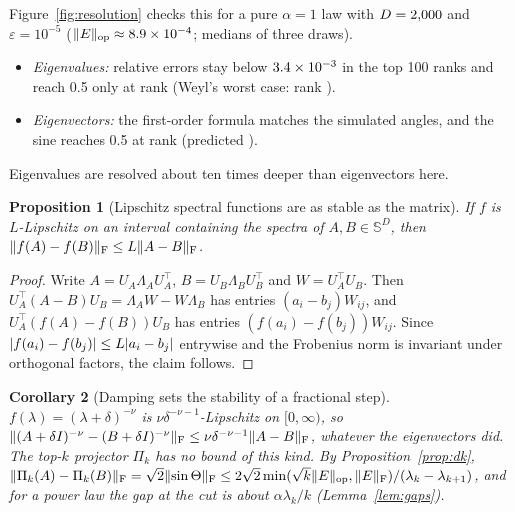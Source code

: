 \documentclass[11pt,a4paper]{article}
\newcommand{\Sym}{\mathbb{S}}
\DeclarePairedDelimiter{\norm}{\lVert}{\rVert}
\DeclarePairedDelimiter{\abs}{\lvert}{\rvert}
\newcommand{\op}{\mathrm{op}}
\newcommand{\F}{\mathrm{F}}
\theoremstyle{plain}
\newtheorem{proposition}{Proposition}[section]
\newtheorem{corollary}[proposition]{Corollary}
\theoremstyle{definition}
\theoremstyle{remark}
\begin{document}
Figure~\ref{fig:resolution} checks this for a pure $\alpha=1$ law with $D=2{,}000$ and $\varepsilon=10^{-5}$
($\norm{E}_\op\approx\NumSimEtaScaled\times10^{-4}$; medians of three draws).
\begin{itemize}
\item \emph{Eigenvalues:} relative errors stay below $3.4\times10^{-3}$ in the top 100 ranks and reach
  0.5 only at rank \NumKvalSim{} (Weyl's worst case: rank \NumKvalWeyl).
\item \emph{Eigenvectors:} the first-order formula matches the simulated angles, and the sine reaches 0.5 at rank
  \NumKvecSim{} (predicted \NumKvecPred).
\end{itemize}
Eigenvalues are resolved about ten times deeper than eigenvectors here.

\begin{proposition}[Lipschitz spectral functions are as stable as the matrix]\label{prop:lipschitz}
If $f$ is $L$-Lipschitz on an interval containing the spectra of $A,B\in\Sym^D$, then
$\norm{f(A)-f(B)}_\F\le L\norm{A-B}_\F$.
\end{proposition}
\begin{proof}
Write $A=U_A\Lambda_AU_A^\top$, $B=U_B\Lambda_BU_B^\top$ and $W=U_A^\top U_B$. Then $U_A^\top(A-B)U_B=\Lambda_AW-W\Lambda_B$
has entries $(a_i-b_j)W_{ij}$, and $U_A^\top(f(A)-f(B))U_B$ has entries $(f(a_i)-f(b_j))W_{ij}$. Since
$\abs{f(a_i)-f(b_j)}\le L\abs{a_i-b_j}$ entrywise and the Frobenius norm is invariant under orthogonal factors, the
claim follows.
\end{proof}

\begin{corollary}[Damping sets the stability of a fractional step]\label{cor:fractional}
$f(\lambda)=(\lambda+\delta)^{-\nu}$ is $\nu\delta^{-\nu-1}$-Lipschitz on $[0,\infty)$, so
$\norm{(A+\delta I)^{-\nu}-(B+\delta I)^{-\nu}}_\F\le\nu\delta^{-\nu-1}\norm{A-B}_\F$, whatever the eigenvectors
did. The top-$k$ projector $\Pi_k$ has no bound of this kind. By Proposition~\ref{prop:dk},
$\norm{\Pi_k(A)-\Pi_k(B)}_\F=\sqrt2\norm{\sin\Theta}_\F\le2\sqrt2\min(\sqrt k\norm{E}_\op,\norm{E}_\F)/(\lambda_k-\lambda_{k+1})$,
and for a power law the gap at the cut is about $\alpha\lambda_k/k$ (Lemma~\ref{lem:gaps}).
\end{corollary}
\end{document}
